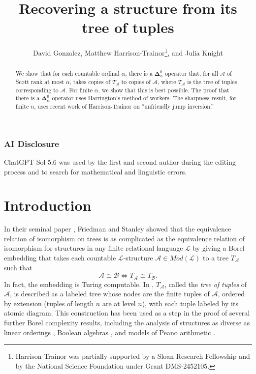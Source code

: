 \documentclass{article}
\newcommand{\bfDelta}{\boldsymbol{\Delta}}
\theoremstyle{definition}
\begin{document}
	
	\title{Recovering a structure from its tree of tuples}
	
	\author{David Gonzalez, Matthew Harrison-Trainor\thanks{Harrison-Trainor was partially supported by a Sloan Research Fellowship and by the National Science Foundation under Grant DMS-2452105.}, and Julia Knight}
	
	\maketitle
	
	\begin{abstract}
		We show that for each countable ordinal $\alpha$, there is a $\bfDelta^0_\alpha$ operator that, for all $\mathcal{A}$ of Scott rank at most $\alpha$, takes copies of $T_\mathcal{A}$ to copies of $\mathcal{A}$, where $T_\mathcal{A}$ is the tree of tuples corresponding to $\mathcal{A}$. For finite $\alpha$, we show that this is best possible. The proof that there is a $\bfDelta^0_\alpha$ operator uses Harrington's method of workers. The sharpness result, for finite $n$, uses recent work of Harrison-Trainor on ``unfriendly jump inversion.''
	\end{abstract}
	
	
	\subsubsection*{AI Disclosure}
	
	{\small ChatGPT Sol 5.6 was used by the first and second author during the editing process and to search for mathematical and linguistic errors.}
	
	\section{Introduction}
	
	In their seminal paper \cite{FriedmanStanley}, Friedman and Stanley showed that the equivalence relation of isomorphism on trees is as complicated as the equivalence relation of isomorphism for structures in any finite relational language $\mathcal{L}$ by giving a Borel embedding that takes each countable $\mathcal{L}$-structure $\mathcal{A} \in Mod(\mathcal{L})$ to a tree $T_{\mathcal{A}}$ such that
	\[ \mathcal{A} \cong \mathcal{B} \Longleftrightarrow T_{\mathcal{A}} \cong T_{\mathcal{B}}.\] In fact, the embedding is Turing computable. 
	In \cite{HTMontalban}, $T_{\mathcal{A}}$, called the \textit{tree of tuples} of $\mathcal{A}$, is described as a labeled tree whose nodes are the finite tuples of $\mathcal{A}$, ordered by extension (tuples of length $n$ are at level $n$), with each tuple labeled by its atomic diagram. This construction has been used as a step in the proof of several further Borel complexity results, including the analysis of structures as diverse as linear orderings \cite{FriedmanStanley}, Boolean algebras \cite{CamerloGao}, and models of Peano arithmetic \cite{MR,GLRS}. 
	
\end{document}
